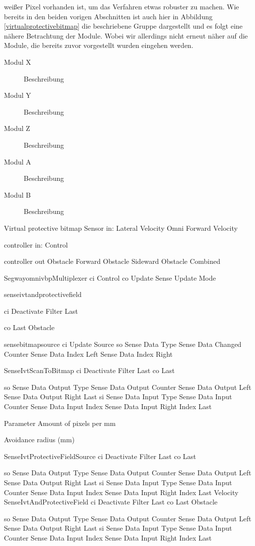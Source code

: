  weißer Pixel vorhanden ist, um das Verfahren etwas robuster zu machen.
 Wie bereits in den beiden vorigen Abschnitten  ist auch hier in Abbildung \ref{virtualprotectivebitmap}
 die beschriebene Gruppe dargestellt und es folgt eine nähere Betrachtung der Module.
 Wobei wir allerdings nicht erneut näher auf die Module, die bereits zuvor
 vorgestellt wurden eingehen werden.


\begin{description}
\item[Modul X] Beschreibung
\item[Modul Y] Beschreibung
\item[Modul Z] Beschreibung
\item[Modul A] Beschreibung
\item[Modul B] Beschreibung
\end{description}
Virtual protective bitmap
Sensor in:
Lateral Velocity
Omni Forward Velocity

controller in:
Control

controller out
Obstacle Forward
Obstacle Sideward
Obstacle Combined

SegwayomnivbpMultiplexer
ci Control
co Update
Sense Update Mode

senseivtandprotectivefield 

ci Deactivate Filter
Last

co Last
Obstacle

sensebitmapsource 
ci Update Source
so Sense Data Type
   Sense Data Changed Counter
   Sense Data Index Left
   Sense Data Index Right

SenseIvtScanToBitmap
ci Deactivate Filter
	Last
co Last

so Sense Data Output Type
   Sense Data Output Counter
   Sense Data Output Left
   Sense Data Output Right
	Last
si Sense Data Input Type
   Sense Data Input Counter
   Sense Data Input Index
   Sense Data Input Right Index
	Last

Parameter
Amount of pixels per mm

Avoidance radius (mm)

SenseIvtProtectiveFieldSource
ci Deactivate Filter
	Last
co Last

so Sense Data Output Type
   Sense Data Output Counter
   Sense Data Output Left
   Sense Data Output Right
	Last
si Sense Data Input Type
   Sense Data Input Counter
   Sense Data Input Index
   Sense Data Input Right Index
	Last
	Velocity
SenseIvtAndProtectiveField
ci Deactivate Filter
	Last
co Last
	Obstacle

so Sense Data Output Type
   Sense Data Output Counter
   Sense Data Output Left
   Sense Data Output Right
	Last
si Sense Data Input Type
   Sense Data Input Counter
   Sense Data Input Index
   Sense Data Input Right Index
	Last